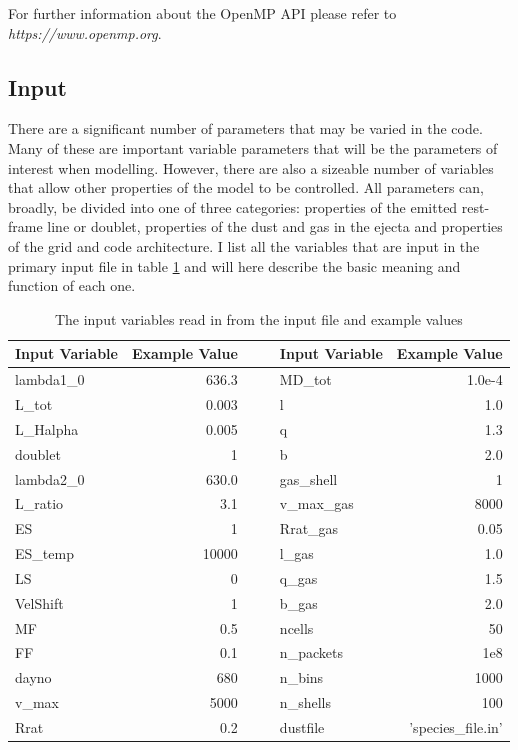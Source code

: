 	For further information about the OpenMP API please refer to \textit{https://www.openmp.org}.
		
	\subsection{Input}
	
There are a significant number of parameters that may be varied in the code.  Many of these are important variable parameters that will be the parameters of interest when modelling.  However, there are also a sizeable number of variables that allow other properties of the model to be controlled.  All parameters can, broadly,  be divided into one of three categories:  properties of the emitted rest-frame line or doublet, properties of the dust and gas in the ejecta and properties of the grid and code architecture.  I list all the variables that are input in the primary input file in table \ref{tbl:input} and will here describe the basic meaning and function of each one.
	
	\begin{table}[htdp]
\caption{The input variables read in from the input file and example values}
\begin{center}
\def\arraystretch{1.5}
\begin{tabular}{l r c c l r}
\toprule
Input Variable & Example Value &&& Input Variable & Example Value\\
\midrule
lambda1\_0 & 636.3 &&& MD\_tot & 1.0e-4\\
L\_tot & 0.003 &&& l & 1.0\\
L\_Halpha & 0.005 &&& q & 1.3\\
doublet & 1 &&& b & 2.0\\
lambda2\_0 & 630.0 &&& gas\_shell & 1\\
L\_ratio & 3.1&&& v\_max\_gas & 8000\\
ES & 1 &&& Rrat\_gas & 0.05\\
ES\_temp & 10000 &&& l\_gas & 1.0\\
LS & 0 &&& q\_gas & 1.5\\
VelShift & 1 &&& b\_gas & 2.0\\
MF & 0.5 &&& ncells & 50\\
FF & 0.1 &&& n\_packets & 1e8\\
dayno & 680 &&& n\_bins & 1000\\
v\_max & 5000 &&& n\_shells & 100\\
Rrat & 0.2 &&& dustfile & 'species\_file.in'\\
\bottomrule
\end{tabular}
\end{center}
\label{tbl:input}
\end{table}%

